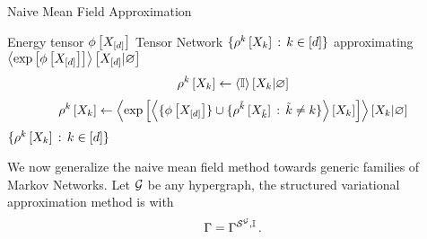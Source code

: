 \begin{algorithm}[h!]
    \caption{Naive Mean Field Approximation}\label{alg:NMF}
    \begin{algorithmic}
        \Require Energy tensor $\phi\left[X_{[d]}\right]$
        \Ensure Tensor Network $\{\rho^{k}\left[X_{k}\right]\,:\,k\in[d]\}$ approximating $\left\langle \mathrm{exp}\left[\phi\left[X_{[d]}\right]\right]\right\rangle \left[ X_{[d]} | \varnothing \right]$
        \iosepline
        \ForAll{$\catenumeratorin$}
            \State
            \begin{align*}
                \rho^{k}\left[X_{k}\right]
                \leftarrow \left\langle \mathbb{I}\right\rangle \left[ X_{k} | \varnothing \right]
            \end{align*}
        \EndFor
            \ForAll{$\catenumeratorin$}
                \State
                \[ \rho^{k}\left[X_{k}\right]
                \leftarrow \left\langle  \mathrm{exp}\left[ \left\langle \{\phi\left[X_{[d]}\right]\}\cup
                \{\rho^{\tilde{k}}\left[X_{\tilde{k}}\right] \,:\, \tilde{k}\neq k\} \right\rangle \left[ X_{k} \right] \right]
                \right\rangle \left[ X_{k} | \varnothing \right] \]
            \EndFor
        \EndWhile
        \State \Return $\{\rho^{k}\left[X_{k}\right]\,:\,k\in[d]\}$
    \end{algorithmic}
\end{algorithm}




We now generalize the naive mean field method towards generic families of Markov Networks.
Let $\mathcal{G}$ be any hypergraph, the structured variational approximation method is  with
\begin{align*}
    \Gamma = \Gamma^{\mathcal{S}^{\mathcal{G}},\mathbb{I}} \, .
\end{align*}

